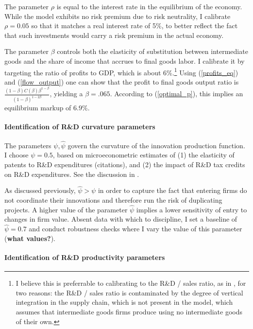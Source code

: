 \documentclass[12pt,english]{article}
\theoremstyle{remark}
\begin{document}
The parameter $\rho$ is equal to the interest rate in the equilibrium of the economy. While the model exhibits no risk premium due to risk neutrality, I calibrate $\rho = 0.05$ so that it matches a real interest rate of 5\%, to better reflect the fact that such investments would carry a risk premium in the actual economy. 

The parameter $\beta$ controls both the elasticity of substitution between intermediate goods and the share of income that accrues to final goods labor. I calibrate it by targeting the ratio of profits to GDP, which is about 6\%.\footnote{I believe this is preferrable to calibrating to the R\&D / sales ratio, as in \cite{akcigit_growth_2018}, for two reasons: the R\&D / sales ratio is contaminated by the degree of vertical integration in the supply chain, which is not present in the model, which assumes that intermediate goods firms produce using no intermediate goods of their own.} Using (\ref{profits_eq}) and (\ref{flow_output}) one can show that the profit to final goods output ratio is $\frac{(1-\beta) C(\beta) \beta^{1-\beta}}{(1-\beta)^{1-2\beta}}$, yielding a $\beta = .065$. According to (\ref{optimal_p}), this implies an equilibrium markup of $6.9\%$.

\paragraph{Identification of R\&D curvature parameters}

The parameters $\psi, \hat{\psi}$ govern the curvature of the innovation production function. I choose $\psi = 0.5$, based on microeconometric estimates of (1) the elasticity of patents to R\&D expenditures (citations), and (2) the impact of R\&D tax credits on R\&D expenditures. See the discussion in \cite{akcigit_growth_2018}. 

As discussed previously, $\hat{\psi} > \psi$ in order to capture the fact that entering firms do not coordinate their innovations and therefore run the risk of duplicating projects. A higher value of the parameter $\hat{\psi}$ implies a lower sensitivity of entry to changes in firm value. Absent data with which to discipline, I set a baseline of $\hat{\psi} = 0.7$ and conduct robustness checks where I vary the value of this parameter (\textbf{what values?}).

\paragraph{Identification of R\&D productivity parameters}
\end{document}
